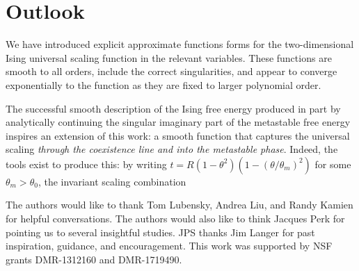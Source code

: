 \documentclass[
aps,
pre,
preprint,
longbibliography,
floatfix
]{revtex4-2}
\begin{document}
\section{Outlook}

We have introduced explicit approximate functions forms for the two-dimensional
Ising universal scaling function in the relevant variables. These functions are
smooth to all orders, include the correct singularities, and appear to converge
exponentially to the function as they are fixed to larger polynomial order.

The successful smooth description of the Ising free energy produced in part by
analytically continuing the singular imaginary part of the metastable free
energy inspires an extension of this work: a smooth function that captures the
universal scaling \emph{through the coexistence line and into the metastable
phase}. Indeed, the tools exist to produce this: by writing
$t=R(1-\theta^2)(1-(\theta/\theta_m)^2)$ for some $\theta_m>\theta_0$, the
invariant scaling combination

\begin{acknowledgments}
  The authors would like to thank Tom Lubensky, Andrea Liu, and Randy Kamien
  for helpful conversations. The authors would also like to think Jacques Perk
  for pointing us to several insightful studies. JPS thanks Jim Langer for past
  inspiration, guidance, and encouragement. This work was supported by NSF
  grants DMR-1312160 and DMR-1719490.
\end{acknowledgments}


\end{document}
